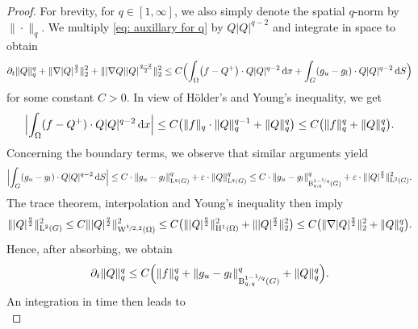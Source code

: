 \documentclass[10pt]{amsart}
\theoremstyle{plain}
\theoremstyle{definition}
\theoremstyle{thm}
\numberwithin{equation}{section}
\newcommand{\rL}{\mathrm{L}}
\newcommand{\rLq}{\rL^q}
\newcommand{\rH}{\mathrm{H}}
\newcommand{\rW}{\mathrm{W}}
\newcommand{\rB}{\mathrm{B}}
\newcommand{\del}{\partial}
\newcommand{\dt}{\del_t}
\newcommand{\srd}{\, \mathrm{d}}
\newcommand{\eps}{\varepsilon}
\begin{document}
\begin{proof}
For brevity, for $q \in [1,\infty]$, we also simply denote the spatial $q$-norm by~$\| \cdot \|_q$.
We multiply \eqref{eq: auxillary for q} by $Q|Q|^{q-2}$ and integrate in space to obtain
\begin{equation*}
    \begin{aligned}
        \dt \| Q \|^q_q + \| \nabla | Q |^{\frac{q}{2}} \|^2_2 + \| |\nabla Q|  | Q|^{\frac{q-2}{2}} \|^2_2
        \leq C   \Bigl ( \int_\Omega \bigl (f - Q^+ \bigr )\cdot Q |Q|^{q-2} \srd x  + \int_G (g_u -g_l) \cdot Q |Q|^{q-2} \srd S\Bigr )
    \end{aligned}
\end{equation*}
for some constant $C>0$. 
In view of H\"older's and Young's inequality, we get
\begin{equation*}
    \Bigl | \int_\Omega (f - Q^+)\cdot Q |Q|^{q-2} \srd x \Bigr | \leq C \bigl ( \| f \|_q \cdot  \| Q \|_q^{q-1} + \| Q \|^q_q \bigr ) \leq C \bigl ( \| f\|^q_q + \| Q\|^q_q \bigr).
\end{equation*}
Concerning the boundary terms, we observe that similar arguments yield
\begin{equation*}
    \begin{aligned}
        \Bigl | \int_G (g_u -g_l) \cdot Q |Q|^{q-2} \srd S\Bigr | 
        \leq C \cdot \| g_u -g_l \|_{\rLq(G)}^q + \eps \cdot \| Q \|^q_{\rLq(G)}
        \leq C \cdot \| g_u -g_l \|^q_{\rB_{q,q}^{1 - \nicefrac{1}{q}}(G)} + \eps \cdot \| |Q|^{\frac{q}{2}} \|^2_{\rL^2(G)}.
    \end{aligned}
\end{equation*}
The trace theorem, interpolation and Young's inequality then imply
\begin{equation*}
    \begin{aligned}
        \| |Q|^{\frac{q}{2}} \|^2_{\rL^2(G)} \leq C \| |Q|^{\frac{q}{2}} \|^2_{\rW^{\nicefrac{1}{2},2}(\Omega)} 
        \leq C \bigl (\| |Q|^{\frac{q}{2}} \|^2_{\rH^{1}(\Omega)} + \||Q|^{\frac{q}{2}} \|^2_2 \bigr )
        \leq C\bigl ( \|\nabla |Q|^{\frac{q}{2}} \|^2_2 + \| Q\|^q_q \bigr ). 
    \end{aligned}
\end{equation*}
Hence, after absorbing, we obtain 
\begin{equation*}
    \dt \| Q \|^q_q \leq C \Bigl ( \| f\|^q_q + \| g_u -g_l \|^q_{\rB_{q,q}^{1 - \nicefrac{1}{q}}(G)}+ \| Q\|^q_q \Bigr). 
\end{equation*}
An integration in time then leads to
\begin{equation*}

\end{equation*}
\end{proof}
\end{document}
